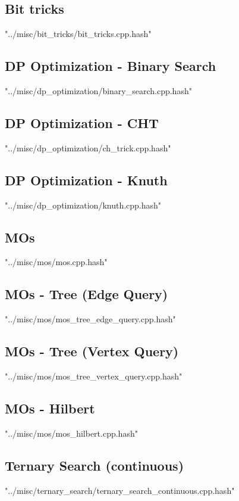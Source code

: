 \documentclass [5pt,twocolumn,oneside]{article}
\begin{document}
\begin{landscape}
\begin{multicols}{3}
\subsection{ Bit tricks}
 {"../misc/bit_tricks/bit_tricks.cpp.hash"}


\subsection{ DP Optimization - Binary Search}
 {"../misc/dp_optimization/binary_search.cpp.hash"}


\subsection{ DP Optimization - CHT}
 {"../misc/dp_optimization/ch_trick.cpp.hash"}


\subsection{ DP Optimization - Knuth}
 {"../misc/dp_optimization/knuth.cpp.hash"}


\subsection{ MOs}
 {"../misc/mos/mos.cpp.hash"}


\subsection{ MOs - Tree (Edge Query)}
 {"../misc/mos/mos_tree_edge_query.cpp.hash"}


\subsection{ MOs - Tree (Vertex Query)}
 {"../misc/mos/mos_tree_vertex_query.cpp.hash"}


\subsection{ MOs - Hilbert}
 {"../misc/mos/mos_hilbert.cpp.hash"}


\subsection{ Ternary Search (continuous)}
 {"../misc/ternary_search/ternary_search_continuous.cpp.hash"}



\end{multicols}
\end{landscape}
\end{document}
